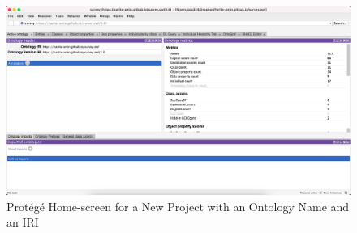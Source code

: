 \begin{doublespace}
\begin{figure}[htp]
    \centering
    \includegraphics[width=15cm]{images/ch4/Figure3.png}
    \caption{Protégé Home-screen for a New Project with an Ontology Name and an IRI}
    \label{fig:4.3}
\end{figure}

\end{doublespace}
